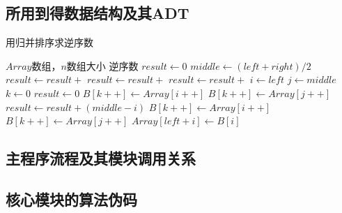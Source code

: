 \documentclass[a4paper]{article}
\begin{document}
    \subsection{所用到得数据结构及其ADT}\label{subsec:adt}
    \begin{algorithm}
        \caption{用归并排序求逆序数}
        \begin{algorithmic}[1] %
            \Require $Array$数组，$n$数组大小
            \Ensure 逆序数
                \State $result \gets 0$
                    \State $middle \gets (left + right) / 2$
                    \State $result \gets result +$ 
                    \State $result \gets result +$ 
                    \State $result \gets result +$ 
                \EndIf
                \State {}
            \EndFunction
            \State
                \State $i\gets left$
                \State $j\gets middle$
                \State $k\gets 0$
                \State $result \gets 0$
                        \State $B[k++]\gets Array[i++]$
                    \Else
                        \State $B[k++] \gets Array[j++]$
                        \State $result \gets result + (middle - i)$
                    \EndIf
                \EndWhile
                    \State $B[k++] \gets Array[i++]$
                \EndWhile
                    \State $B[k++] \gets Array[j++]$
                \EndWhile
                    \State $Array[left + i] \gets B[i]$
                \EndFor
                \State {}
            \EndFunction
        \end{algorithmic}\label{alg:algorithm}
    \end{algorithm}

    \subsection{主程序流程及其模块调用关系}\label{subsec:relate}

    \subsection{核心模块的算法伪码}\label{subsec:code}
\end{document}

